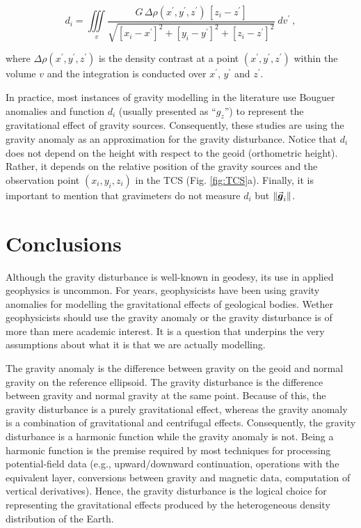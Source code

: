 \documentclass[extra]{gji}
\renewcommand{\vector}[1]{\vec{\mitbf{#1}}}
\begin{document}
\begin{equation}
d_{i} = \iiint\limits_{v}
\frac{G \, \Delta\rho(x^{\prime}, y^{\prime}, z^{\prime}) \,
[z_{i} - z^{\prime}]}
{\sqrt{[x_{i} - x^{\prime}]^{2} +
[y_{i} - y^{\prime}]^{2} + [z_{i} - z^{\prime}]^{2}}} \: dv^{\prime} \: ,
\label{eq:gz-local}
\end{equation}

\noindent
where $\Delta\rho(x^{\prime}, y^{\prime}, z^{\prime})$
is the density contrast at a point $(x^{\prime}, y^{\prime}, z^{\prime})$
within the volume $v$ and the integration is conducted over $x^{\prime}$,
$y^{\prime}$ and $z^{\prime}$.

In practice, most instances of gravity modelling in the literature use Bouguer
anomalies and function $d_{i}$ (usually presented as ``$g_z$'') to represent
the gravitational effect of gravity sources.
Consequently, these studies are using the gravity
anomaly as an approximation for the gravity disturbance.
Notice that $d_{i}$ does not depend on the
height with respect to the geoid (orthometric height).
Rather, it depends on the relative position of the gravity sources and the
observation point $(x_{i}, y_{i}, z_{i})$ in the TCS (Fig. \ref{fig:TCS}a).
Finally, it is important to mention that gravimeters do not measure $d_{i}$ but
$\| \vector{g}_i \|$.


\section{Conclusions}

Although the gravity disturbance is well-known in geodesy,
its use in applied geophysics is uncommon.
For years, geophysicists have been using gravity anomalies for modelling
the gravitational effects of geological bodies.
Wether geophysicists should use the gravity anomaly or the gravity disturbance
is of more than mere academic interest.
It is a question that underpins the very assumptions about what it is that we
are actually modelling.

The gravity anomaly is the difference between
gravity on the geoid and normal gravity on the reference ellipsoid.
The gravity disturbance is the difference between gravity and normal gravity at
the same point.
Because of this, the gravity disturbance is a purely gravitational effect,
whereas the gravity anomaly is a combination of gravitational and centrifugal
effects.
Consequently, the gravity disturbance is a harmonic function while the
gravity anomaly is not.
Being a harmonic function is the premise required by most techniques for
processing potential-field data
(e.g., upward/downward continuation, operations with the equivalent layer,
conversions between gravity and magnetic data, computation of vertical
derivatives).
Hence, the gravity disturbance is the logical choice for
representing the gravitational effects produced by the heterogeneous density
distribution of the Earth.
\end{document}
